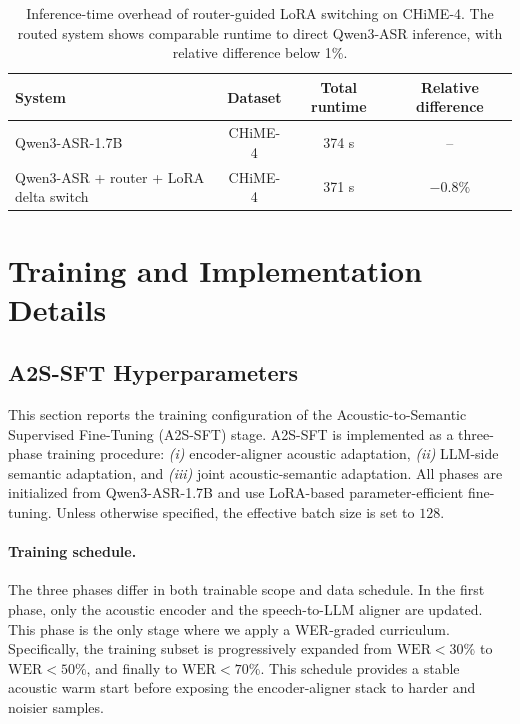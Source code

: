 \documentclass{article}
\begin{document}
\begin{table}[t]
\centering
\small
\caption{Inference-time overhead of router-guided LoRA switching on CHiME-4. The routed system shows comparable runtime to direct Qwen3-ASR inference, with relative difference below 1\%.}
\label{tab:router_latency}
\begin{tabular}{lccc}
\toprule
\textbf{System} & \textbf{Dataset} & \textbf{Total runtime} & \textbf{Relative difference} \\
\midrule
Qwen3-ASR-1.7B
& CHiME-4 & 374 s & -- \\

Qwen3-ASR + router + LoRA delta switch
& CHiME-4 & 371 s & $-0.8\%$ \\
\bottomrule
\end{tabular}
\end{table}


\newpage
\section{Training and Implementation Details}
\subsection{A2S-SFT Hyperparameters}
\label{app:a2s_sft_hparams}

This section reports the training configuration of the Acoustic-to-Semantic
Supervised Fine-Tuning (A2S-SFT) stage. A2S-SFT is implemented as a three-phase
training procedure: \textit{(i)} encoder-aligner acoustic adaptation,
\textit{(ii)} LLM-side semantic adaptation, and \textit{(iii)} joint
acoustic-semantic adaptation. All phases are initialized from Qwen3-ASR-1.7B and
use LoRA-based parameter-efficient fine-tuning. Unless otherwise specified, the
effective batch size is set to $128$.

\paragraph{Training schedule.}
The three phases differ in both trainable scope and data schedule. In the first
phase, only the acoustic encoder and the speech-to-LLM aligner are updated. This
phase is the only stage where we apply a WER-graded curriculum. Specifically, the
training subset is progressively expanded from $\mathrm{WER}<30\%$ to
$\mathrm{WER}<50\%$, and finally to $\mathrm{WER}<70\%$. This schedule provides a
stable acoustic warm start before exposing the encoder-aligner stack to harder
and noisier samples.
\end{document}
